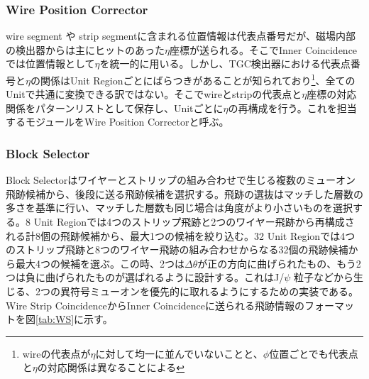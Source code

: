 \subsubsection*{Wire Position Corrector}
wire segment や strip segmentに含まれる位置情報は代表点番号だが、磁場内部の検出器からは主にヒットのあった$\eta$座標が送られる。そこでInner Coincidenceでは位置情報として$\eta$を統一的に用いる。しかし、TGC検出器における代表点番号と$\eta$の関係はUnit Regionごとにばらつきがあることが知られており\footnote{wireの代表点が$\eta$に対して均一に並んでいないことと、$\phi$位置ごとでも代表点と$\eta$の対応関係は異なることによる}、全てのUnitで共通に変換できる訳ではない。そこでwireとstripの代表点と$\eta$座標の対応関係をパターンリストとして保存し、Unitごとに$\eta$の再構成を行う。これを担当するモジュールをWire Position Correctorと呼ぶ。

\subsubsection*{Block Selector}
Block Selectorはワイヤーとストリップの組み合わせで生じる複数のミューオン飛跡候補から、後段に送る飛跡候補を選択する。飛跡の選抜はマッチした層数の多さを基準に行い、マッチした層数も同じ場合は角度がより小さいものを選択する。8 Unit Regionでは4つのストリップ飛跡と2つのワイヤー飛跡から再構成される計8個の飛跡候補から、最大1つの候補を絞り込む。32 Unit Regionでは4つのストリップ飛跡と8つのワイヤー飛跡の組み合わせからなる32個の飛跡候補から最大4つの候補を選ぶ。この時、2つは$\Delta\theta$が正の方向に曲げられたもの、もう2つは負に曲げられたものが選ばれるように設計する。これはJ/$\psi$ 粒子などから生じる、2つの異符号ミューオンを優先的に取れるようにするための実装である。
Wire Strip CoincidenceからInner Coincidenceに送られる飛跡情報のフォーマットを図\ref{tab:WS}に示す。

